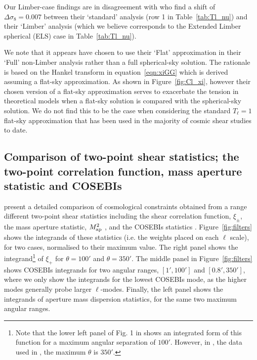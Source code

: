 Our Limber-case findings are in disagreement with \citet{kitching/etal:2016} who find a shift of $\Delta \sigma_8 = 0.007$ between their `standard' analysis (row 1 in Table~\ref{tab:Tl_nu}) and their `Limber' analysis (which we believe corresponds to the Extended Limber spherical (ELS) case in Table~\ref{tab:Tl_nu}).  

We note that it appears \citet{kitching/etal:2016} have chosen to use their `Flat' approximation in their `Full' non-Limber analysis rather than a full spherical-sky solution.  The rationale is based on the Hankel transform in equation~\ref{eqn:xiGG} which is derived assuming a flat-sky approximation.  As shown in Figure~\ref{fig:Cl_xi}, however their chosen version of a flat-sky approximation serves to exacerbate the tension in theoretical models when a flat-sky solution is compared with the spherical-sky solution. We do not find this to be the case when considering the standard $T_\ell = 1$ flat-sky approximation that has been used in the majority of cosmic shear studies to date.

\subsection{Comparison of two-point shear statistics; the two-point correlation function, mass aperture statistic and COSEBIs}
\citet{kilbinger/etal:2013} present a detailed comparison of cosmological constraints obtained from a range different two-point shear statistics including the shear correlation function, $\xi_\pm$, the mass aperture statistic, $M_ {\rm ap}^2$ \citep{schneider/etal:1998}, and the COSEBIs statistics \citep{schneider/etal:2010}.  Figure~\ref{fig:filters} shows the integrands of these statistics (i.e. the weights placed on each $\ell$ scale),  for two cases, normalised to their maximum value.  The right panel shows the integrand\footnote{Note that the lower left panel of Fig. 1 in \citet{kitching/etal:2016} shows an integrated form of this function for a maximum
angular separation of $100'$. However, in \citet{kilbinger/etal:2013}, the data used in \citet{kitching/etal:2016}, 
the maximum $\theta$ is $350'$.} of $\xi_+$ for $\theta=100'$ and $\theta=350'$. The middle panel in Figure~\ref{fig:filters} shows COSEBIs integrands for two angular ranges, $[1',100']$ and $[0.8',350']$, where we only show the integrands for the lowest COSEBIs mode, as the higher modes generally probe larger $\ell$-modes.  Finally, the left panel shows the integrands of aperture mass dispersion statistics, for the same two maximum angular ranges.

